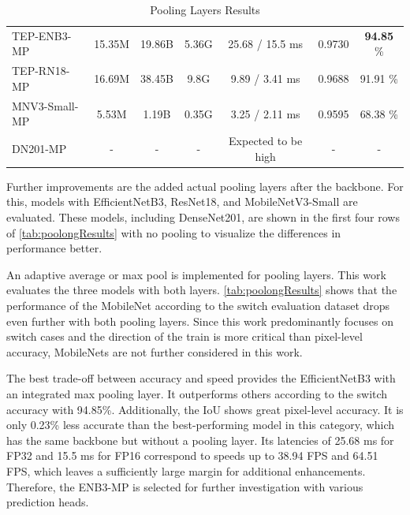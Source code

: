\begin{table}[H]
{\begin{minipage}{0.95\textwidth}
\begin{tabular}{lcccccc}
            \hline
            \rowcolor[gray]{0.9} TEP-ENB3-MP   & 15.35M            & 19.86B         & 5.36G          & 25.68 / 15.5 ms         & 0.9730          & \textbf{94.85} \% \\ 
            \rowcolor{white}     TEP-RN18-MP   & 16.69M            & 38.45B         & 9.8G           & 9.89 / 3.41 ms          & 0.9688          & 91.91 \% \\ 
            \rowcolor[gray]{0.9} MNV3-Small-MP & 5.53M             & 1.19B          & 0.35G          & 3.25 / 2.11 ms          & 0.9595          & 68.38 \% \\ 
            \rowcolor{white}     DN201-MP      & -                 & -              & -              & Expected to be high     & -               & - \\ 
            \hline
        \end{tabular}
    \end{minipage}
    }
    \caption{Pooling Layers Results}
    \label{tab:poolongResults}
\end{table}

Further improvements are the added actual pooling layers after the backbone.
For this, models with EfficientNetB3, ResNet18, and MobileNetV3-Small are evaluated.
These models, including DenseNet201, are shown in the first four rows of \autoref{tab:poolongResults} with no pooling to visualize the differences in performance better.

An adaptive average or max pool is implemented for pooling layers.
This work evaluates the three models with both layers.
\autoref{tab:poolongResults} shows that the performance of the MobileNet according to the switch evaluation dataset drops even further with both pooling layers.
Since this work predominantly focuses on switch cases and the direction of the train is more critical than pixel-level accuracy, MobileNets are not further considered in this work.

The best trade-off between accuracy and speed provides the EfficientNetB3 with an integrated max pooling layer.
It outperforms others according to the switch accuracy with 94.85\%.
Additionally, the \ac{IoU} shows great pixel-level accuracy.
It is only 0.23\% less accurate than the best-performing model in this category, which has the same backbone but without a pooling layer.
Its latencies of 25.68 ms for FP32 and 15.5 ms for FP16 correspond to speeds up to 38.94 \ac{FPS} and 64.51 \ac{FPS}, which leaves a sufficiently large margin for additional enhancements.
Therefore, the ENB3-MP is selected for further investigation with various prediction heads.

